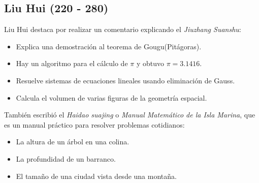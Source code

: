 \documentclass[12pt, aspectratio=169]{beamer} %
\begin{document}
	\subsection{Liu Hui (220 - 280)}
		\begin{frame}
			
			\pause
			
			Liu Hui destaca por realizar un comentario explicando el \textit{Jiuzhang Suanshu}:

			\begin{itemize}
				\item Explica una demostración al teorema de Gougu(Pitágoras).
				\item Hay un algoritmo para el cálculo de $\pi$ y obtuvo $\pi = 3.1416$.
				\item Resuelve sistemas de ecuaciones lineales usando eliminación de Gauss.
				\item Calcula el volumen de varias figuras de la geometría espacial.
			\end{itemize}
	
			\pause

			También escribió el \textit{Haidao suajing} o \textit{Manual Matemático de la Isla Marina}, que es un manual
			práctico para resolver problemas cotidianos:
			
			\begin{itemize}
				\item La altura de un árbol en una colina.
				\item La profundidad de un barranco.
				\item El tamaño de una ciudad vista desde una montaña.
			\end{itemize}
			
		\end{frame}
\end{document}
